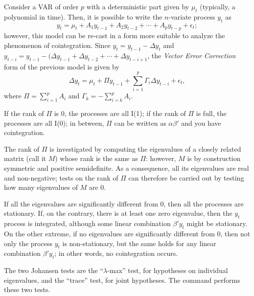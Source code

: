 Consider a VAR of order $p$ with a deterministic part given by $\mu_t$
(typically, a polynomial in time). Then, it is possible to write the $n$-variate
process $y_t$ as 
\[
  y_t = \mu_t + A_1 y_{t-1} + A_2 y_{t-2} + \cdots + A_p y_{t-p} +
  \epsilon_t ;
\]
however, this model can be re-cast in a form more suitable to analyze
the phenomenon of cointegration. Since $y_t = y_{t-1} - \Delta y_t$
and $y_{t-i} = y_{t-1} - (\Delta y_{t-1} + \Delta y_{t-2} + \cdots +
\Delta y_{t-i+1}$, the \emph{Vector Error Correction} form of the
previous model is given by
\begin{equation}
  \label{eq:Joh-tests}
  \Delta y_t = \mu_t + \Pi y_{t-1} + \sum_{i=1}^p \Gamma_i \Delta
  y_{t-i} + \epsilon_t ,
\end{equation}
where $\Pi = \sum_{i=1}^p A_i$ and $\Gamma_k = -\sum_{i=k}^p A_i$.

If the rank of $\Pi$ is 0, the processes are all I(1); if the rank of
$\Pi$ is full, the processes are all I(0); in between, $\Pi$ can be
written as $\alpha \beta'$ and you have cointegration.

The rank of $\Pi$ is investigated by computing the eigenvalues of a
closely related matrix (call it $M$) whose rank is the same as $\Pi$:
however, $M$ is by construction symmetric and positive semidefinite.
As a consequence, all its eigenvalues are real and non-negative; tests
on the rank of $\Pi$ can therefore be carried out by testing how many
eigenvalues of $M$ are 0.

If all the eigenvalues are significantly different from 0, then all the
processes are stationary. If, on the contrary, there is at least one
zero eigenvalue, then the $y_t$ process is integrated, although some
linear combination $\beta'y_t$ might be stationary. On the other
extreme, if no eigenvalues are significantly different from 0, then not
only the process $y_t$ is non-stationary, but the same holds for any
linear combination $\beta'y_t$; in other words, no cointegration
occurs.

The two Johansen tests are the ``$\lambda$-max'' test, for hypotheses
on individual eigenvalues, and the ``trace'' test, for joint
hypotheses.  The  command  performs these two
tests.  

